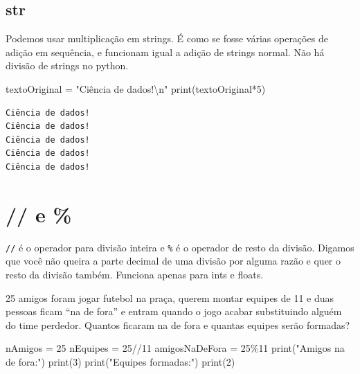 \documentclass[
  letterpaper,
  DIV=11,
  numbers=noendperiod]{scrreprt}
\newenvironment{Shaded}{\begin{snugshade}}{\end{snugshade}}
\newcommand{\BuiltInTok}[1]{\textcolor[rgb]{0.00,0.23,0.31}{#1}}
\newcommand{\CharTok}[1]{\textcolor[rgb]{0.13,0.47,0.30}{#1}}
\newcommand{\DecValTok}[1]{\textcolor[rgb]{0.68,0.00,0.00}{#1}}
\newcommand{\NormalTok}[1]{\textcolor[rgb]{0.00,0.23,0.31}{#1}}
\newcommand{\OperatorTok}[1]{\textcolor[rgb]{0.37,0.37,0.37}{#1}}
\newcommand{\StringTok}[1]{\textcolor[rgb]{0.13,0.47,0.30}{#1}}
\begin{document}
\hypertarget{str-2}{%
\subsection{str}\label{str-2}}

Podemos usar multiplicação em strings. É como se fosse várias operações
de adição em sequência, e funcionam igual a adição de strings normal.
Não há divisão de strings no python.

\begin{Shaded}
\begin{Highlighting}[]
\NormalTok{textoOriginal }\OperatorTok{=} \StringTok{"Ciência de dados!}\CharTok{\textbackslash{}n}\StringTok{"}
\BuiltInTok{print}\NormalTok{(textoOriginal}\OperatorTok{*}\DecValTok{5}\NormalTok{)}
\end{Highlighting}
\end{Shaded}

\begin{tcolorbox}[enhanced jigsaw, breakable, leftrule=.75mm, left=2mm, opacityback=0, bottomrule=.15mm, toprule=.15mm, rightrule=.15mm, arc=.35mm, colback=white]

\begin{verbatim}
Ciência de dados!
Ciência de dados!
Ciência de dados!
Ciência de dados!
Ciência de dados!
\end{verbatim}

\end{tcolorbox}

\hypertarget{e-1}{%
\section{// e \%}\label{e-1}}

\texttt{//} é o operador para divisão inteira e \texttt{\%} é o operador
de resto da divisão. Digamos que você não queira a parte decimal de uma
divisão por alguma razão e quer o resto da divisão também. Funciona
apenas para ints e floats.

25 amigos foram jogar futebol na praça, querem montar equipes de 11 e
duas pessoas ficam ``na de fora'' e entram quando o jogo acabar
substituindo alguém do time perdedor. Quantos ficaram na de fora e
quantas equipes serão formadas?

\begin{Shaded}
\begin{Highlighting}[]
\NormalTok{nAmigos }\OperatorTok{=} \DecValTok{25}
\NormalTok{nEquipes }\OperatorTok{=} \DecValTok{25}\OperatorTok{//}\DecValTok{11}
\NormalTok{amigosNaDeFora }\OperatorTok{=} \DecValTok{25}\OperatorTok{\%}\DecValTok{11}
\BuiltInTok{print}\NormalTok{(}\StringTok{"Amigos na de fora:"}\NormalTok{)}
\BuiltInTok{print}\NormalTok{(}\DecValTok{3}\NormalTok{)}
\BuiltInTok{print}\NormalTok{(}\StringTok{"Equipes formadas:"}\NormalTok{)}
\BuiltInTok{print}\NormalTok{(}\DecValTok{2}\NormalTok{)}
\end{Highlighting}
\end{Shaded}
\end{document}
